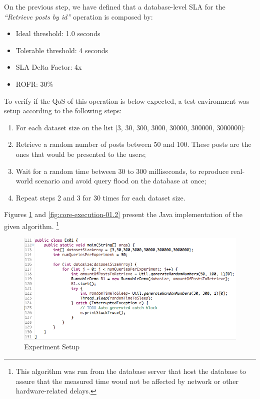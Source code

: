 On the previous step, we have defined that a database-level SLA for the \textit{``Retrieve posts by id''} operation is composed by: 

\begin{itemize}
	\item{Ideal threshold: 1.0 seconds}
	\item{Tolerable threshold: 4 seconds}
	\item{SLA Delta Factor: 4x}
	\item{ROFR: 30\%}
\end{itemize}

To verify if the QoS of this operation is below expected, a test environment was setup according to the following steps: 

\begin{enumerate}
\item{For each dataset size on the list [3, 30, 300, 3000, 30000, 300000, 3000000]: }
\item{Retrieve a random number of posts between 50 and 100. These posts are the ones that would be presented to the users;}
\item{Wait for a random time between 30 to 300 milliseconds, to reproduce real-world scenario and avoid	query flood on the database at once;}
\item{Repeat steps 2 and 3 for 30 times for each dataset size.}
\end{enumerate}


Figures \ref{fig:core-execution-01} and \ref{fig:core-execution-01.2} present the Java implementation of the given algorithm. \footnote{This algorithm was run from the database server that host the database to assure that the measured time woud not be affected by network or other hardware-related delays.}


\begin{figure}[ht!]
\centering
\includegraphics[width=120mm]{Imagens/core-execution-01-1.png}
\caption{Experiment Setup \label{fig:core-execution-01}}
\end{figure}

